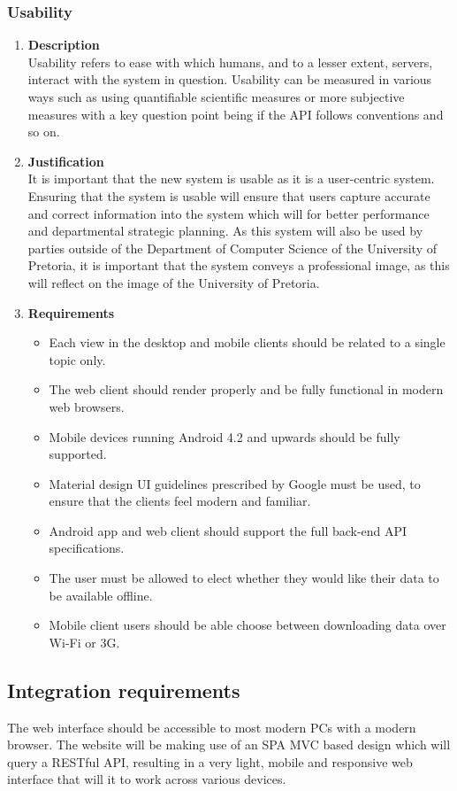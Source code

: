 \documentclass[a4paper,10pt]{article}
\begin{document}
\subsubsection{Usability}
\begin{enumerate}
\item \textbf{Description} \\
Usability refers to ease with which humans, and to a lesser extent, servers, interact with the system in question. Usability can be measured in various ways such as using quantifiable scientific measures or more subjective measures with a key question point being if the API follows conventions and so on.
\item \textbf{Justification} \\
It is important that the new system is usable as it is a user-centric system. Ensuring that the system is usable will ensure that users capture accurate and correct information into the system which will for better performance and departmental strategic planning. As this system will also be used by parties outside of the Department of Computer Science of the University of Pretoria, it is important that the system conveys a professional image, as this will reflect on the image of the University of Pretoria. 
\item \textbf{Requirements}
	\begin{itemize}
		\item Each view in the desktop and mobile clients should be related to a single topic only.
		\item The web client should render properly and be fully functional in modern web browsers.
		\item Mobile devices running Android 4.2 and upwards should be fully supported.
		\item Material design UI guidelines prescribed by Google must be used, to ensure that the clients feel modern and familiar. 
		\item Android app and web client should support the full back-end API specifications.
		\item The user must be allowed to elect whether they would like their data to be available offline.
		\item Mobile client users should be able choose between downloading data over Wi-Fi or 3G. 
	\end{itemize}
\end{enumerate}

\subsection{Integration requirements}
The web interface should be accessible to most modern PCs with a modern browser. The website will be making use of an SPA MVC based design which will query a RESTful API, resulting in a very light, mobile and responsive web interface that will it to work across various devices.
\end{document}
